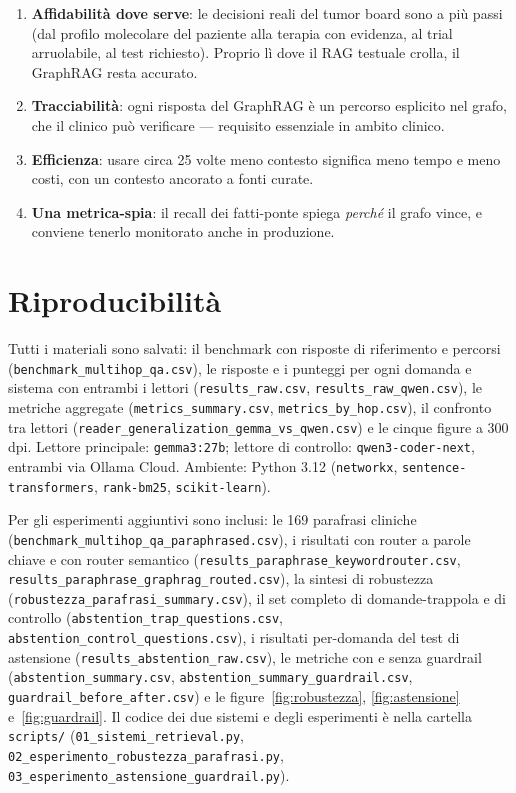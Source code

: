 \documentclass[11pt,a4paper]{report}
\begin{document}
\begin{enumerate}
  \item \textbf{Affidabilità dove serve}: le decisioni reali del tumor board
        sono a più passi (dal profilo molecolare del paziente alla terapia
        con evidenza, al trial arruolabile, al test richiesto). Proprio lì
        dove il RAG testuale crolla, il GraphRAG resta accurato.
  \item \textbf{Tracciabilità}: ogni risposta del GraphRAG è un percorso
        esplicito nel grafo, che il clinico può verificare --- requisito
        essenziale in ambito clinico.
  \item \textbf{Efficienza}: usare circa 25 volte meno contesto significa
        meno tempo e meno costi, con un contesto ancorato a fonti curate.
  \item \textbf{Una metrica-spia}: il recall dei fatti-ponte spiega
        \emph{perché} il grafo vince, e conviene tenerlo monitorato anche in
        produzione.
\end{enumerate}

\section{Riproducibilità}

Tutti i materiali sono salvati: il benchmark con risposte di riferimento e
percorsi (\texttt{benchmark\_multihop\_qa.csv}), le risposte e i punteggi
per ogni domanda e sistema con entrambi i lettori
(\texttt{results\_raw.csv}, \texttt{results\_raw\_qwen.csv}), le metriche
aggregate (\texttt{metrics\_summary.csv}, \texttt{metrics\_by\_hop.csv}), il
confronto tra lettori (\texttt{reader\_generalization\_gemma\_vs\_qwen.csv})
e le cinque figure a 300 dpi. Lettore principale: \texttt{gemma3:27b};
lettore di controllo: \texttt{qwen3-coder-next}, entrambi via Ollama Cloud.
Ambiente: Python 3.12 (\texttt{networkx}, \texttt{sentence-transformers},
\texttt{rank-bm25}, \texttt{scikit-learn}).

Per gli esperimenti aggiuntivi sono inclusi: le 169 parafrasi cliniche
(\texttt{benchmark\_multihop\_qa\_paraphrased.csv}), i risultati con router a
parole chiave e con router semantico
(\texttt{results\_paraphrase\_keywordrouter.csv},
\texttt{results\_paraphrase\_graphrag\_routed.csv}), la sintesi di robustezza
(\texttt{robustezza\_parafrasi\_summary.csv}), il set completo di
domande-trappola e di controllo
(\texttt{abstention\_trap\_questions.csv},
\texttt{abstention\_control\_questions.csv}), i risultati per-domanda del test
di astensione (\texttt{results\_abstention\_raw.csv}), le metriche con e senza
guardrail (\texttt{abstention\_summary.csv},
\texttt{abstention\_summary\_guardrail.csv},
\texttt{guardrail\_before\_after.csv}) e le figure~\ref{fig:robustezza},
\ref{fig:astensione} e~\ref{fig:guardrail}. Il codice dei due sistemi e degli
esperimenti è nella cartella \texttt{scripts/}
(\texttt{01\_sistemi\_retrieval.py}, \texttt{02\_esperimento\_robustezza\_parafrasi.py},
\texttt{03\_esperimento\_astensione\_guardrail.py}).
\end{document}
